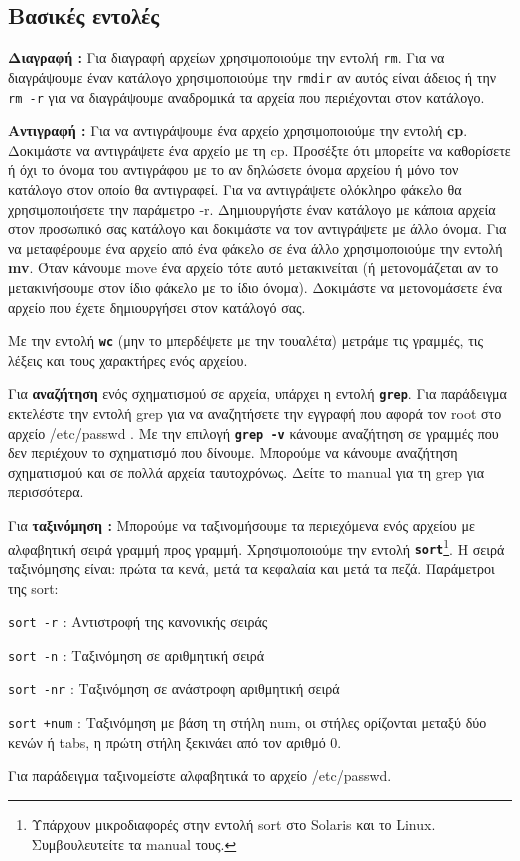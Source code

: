 \subsection{Βασικές εντολές}
\begin{packed_item}
  \item \textbf{Διαγραφή :} Για διαγραφή αρχείων χρησιμοποιούμε την εντολή \texttt{rm}. Για να διαγράψουμε έναν κατάλογο χρησιμοποιούμε την 	\texttt{rmdir} αν αυτός είναι άδειος ή την \texttt{rm -r} για να διαγράψουμε αναδρομικά τα αρχεία που περιέχονται στον κατάλογο.
  \item \textbf{Αντιγραφή :} Για να αντιγράψουμε ένα αρχείο χρησιμοποιούμε την εντολή \textbf{cp}. Δοκιμάστε να αντιγράψετε ένα αρχείο με τη cp. Προσέξτε ότι μπορείτε να καθορίσετε ή όχι το όνομα του αντιγράφου με το αν δηλώσετε όνομα αρχείου ή μόνο τον κατάλογο στον οποίο θα αντιγραφεί. Για να αντιγράψετε ολόκληρο φάκελο θα χρησιμοποιήσετε την παράμετρο -r. Δημιουργήστε έναν κατάλογο με κάποια αρχεία στον προσωπικό σας κατάλογο και δοκιμάστε να τον αντιγράψετε με άλλο όνομα. Για να μεταφέρουμε ένα αρχείο από ένα φάκελο σε ένα άλλο χρησιμοποιούμε την εντολή \textbf{mv}. Όταν κάνουμε move ένα αρχείο τότε αυτό μετακινείται (ή μετονομάζεται αν το μετακινήσουμε στον ίδιο φάκελο με το ίδιο όνομα). Δοκιμάστε να μετονομάσετε ένα αρχείο που έχετε δημιουργήσει στον κατάλογό σας.  
  \item Με την εντολή \textbf{\texttt{wc}} (μην το μπερδέψετε με την τουαλέτα) μετράμε τις γραμμές, τις λέξεις και τους χαρακτήρες ενός
  αρχείου. 
  \item Για \textbf{αναζήτηση} ενός σχηματισμού σε αρχεία, υπάρχει η εντολή \textbf{\texttt{grep}}. Για παράδειγμα εκτελέστε την εντολή grep για να αναζητήσετε την εγγραφή που αφορά τον root στο αρχείο /etc/passwd . Με την επιλογή \texttt{\textbf{grep -v}} κάνουμε αναζήτηση σε γραμμές που δεν περιέχουν το σχηματισμό που δίνουμε. Μπορούμε να κάνουμε αναζήτηση σχηματισμού και σε πολλά αρχεία ταυτοχρόνως. Δείτε το manual για τη grep για περισσότερα.
  \item Για \textbf{ταξινόμηση :} Μπορούμε να ταξινομήσουμε τα περιεχόμενα ενός αρχείου με αλφαβητική σειρά γραμμή προς γραμμή.
  Χρησιμοποιούμε την εντολή \textbf{\texttt{sort}}\footnote{Υπάρχουν μικροδιαφορές στην εντολή sort στο Solaris και το Linux. Συμβουλευτείτε 	τα manual τους.}. Η σειρά ταξινόμησης είναι: πρώτα τα κενά, μετά τα κεφαλαία και μετά τα πεζά. Παράμετροι της sort:
  \begin{packed_item}
    \item \texttt{sort -r} : Αντιστροφή της κανονικής σειράς
    \item \texttt{sort -n} : Ταξινόμηση σε αριθμητική σειρά
    \item \texttt{sort -nr} : Ταξινόμηση σε ανάστροφη αριθμητική σειρά
    \item \texttt{sort +num} : Ταξινόμηση με βάση τη στήλη num, οι στήλες ορίζονται μεταξύ δύο κενών ή tabs, η πρώτη στήλη ξεκινάει από τον
    αριθμό 0.
  \end{packed_item}
  Για παράδειγμα ταξινομείστε αλφαβητικά το αρχείο /etc/passwd.
\end{packed_item}



